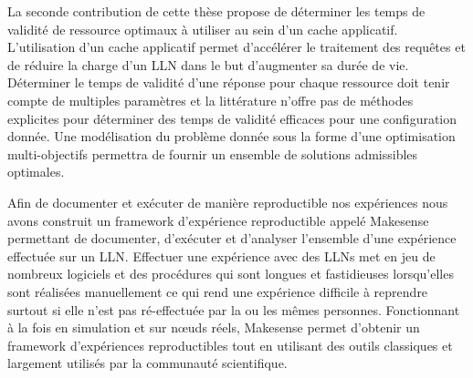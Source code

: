 {La seconde contribution de cette thèse propose de déterminer les temps de validité de ressource optimaux à utiliser au sein d'un cache applicatif.
L'utilisation d'un cache applicatif permet d'accélérer le traitement des requêtes et de réduire la charge d'un \ac{LLN} dans le but d'augmenter sa durée de vie.
Déterminer le temps de validité d'une réponse pour chaque ressource doit tenir compte de multiples paramètres et la littérature n'offre pas de méthodes explicites pour déterminer des temps de validité efficaces pour une configuration donnée.
Une modélisation du problème donnée sous la forme d'une optimisation multi-objectifs permettra de fournir un ensemble de solutions admissibles optimales.

Afin de documenter et exécuter de manière reproductible nos expériences nous avons construit un framework d'expérience reproductible appelé Makesense permettant de documenter, d'exécuter et d'analyser l'ensemble d'une expérience effectuée sur un \ac{LLN}.
Effectuer une expérience avec des \ac{LLN}s met en jeu de nombreux logiciels et des procédures qui sont longues et fastidieuses lorsqu'elles sont réalisées manuellement ce qui rend une expérience difficile à reprendre surtout si elle n'est pas ré-effectuée par la ou les mêmes personnes.
Fonctionnant à la fois en simulation et sur nœuds réels, Makesense permet d'obtenir un framework d'expériences reproductibles tout en utilisant des outils classiques et largement utilisés par la communauté scientifique.
}

\resumefr

\endgroup

\vfill
